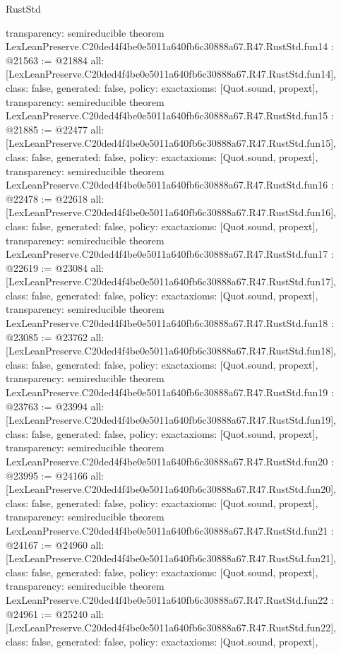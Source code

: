 \begin{lexlean}{RustStd}
\begin{coremodule}
{  transparency: semireducible
}
theorem LexLeanPreserve.C20ded4f4be0e5011a640fb6c30888a67.R47.RustStd.fun14 : @21563 := @21884 {
  all: [LexLeanPreserve.C20ded4f4be0e5011a640fb6c30888a67.R47.RustStd.fun14],
  class: false,
  generated: false,
  policy: exact{axioms: [Quot.sound, propext]},
  transparency: semireducible
}
theorem LexLeanPreserve.C20ded4f4be0e5011a640fb6c30888a67.R47.RustStd.fun15 : @21885 := @22477 {
  all: [LexLeanPreserve.C20ded4f4be0e5011a640fb6c30888a67.R47.RustStd.fun15],
  class: false,
  generated: false,
  policy: exact{axioms: [Quot.sound, propext]},
  transparency: semireducible
}
theorem LexLeanPreserve.C20ded4f4be0e5011a640fb6c30888a67.R47.RustStd.fun16 : @22478 := @22618 {
  all: [LexLeanPreserve.C20ded4f4be0e5011a640fb6c30888a67.R47.RustStd.fun16],
  class: false,
  generated: false,
  policy: exact{axioms: [Quot.sound, propext]},
  transparency: semireducible
}
theorem LexLeanPreserve.C20ded4f4be0e5011a640fb6c30888a67.R47.RustStd.fun17 : @22619 := @23084 {
  all: [LexLeanPreserve.C20ded4f4be0e5011a640fb6c30888a67.R47.RustStd.fun17],
  class: false,
  generated: false,
  policy: exact{axioms: [Quot.sound, propext]},
  transparency: semireducible
}
theorem LexLeanPreserve.C20ded4f4be0e5011a640fb6c30888a67.R47.RustStd.fun18 : @23085 := @23762 {
  all: [LexLeanPreserve.C20ded4f4be0e5011a640fb6c30888a67.R47.RustStd.fun18],
  class: false,
  generated: false,
  policy: exact{axioms: [Quot.sound, propext]},
  transparency: semireducible
}
theorem LexLeanPreserve.C20ded4f4be0e5011a640fb6c30888a67.R47.RustStd.fun19 : @23763 := @23994 {
  all: [LexLeanPreserve.C20ded4f4be0e5011a640fb6c30888a67.R47.RustStd.fun19],
  class: false,
  generated: false,
  policy: exact{axioms: [Quot.sound, propext]},
  transparency: semireducible
}
theorem LexLeanPreserve.C20ded4f4be0e5011a640fb6c30888a67.R47.RustStd.fun20 : @23995 := @24166 {
  all: [LexLeanPreserve.C20ded4f4be0e5011a640fb6c30888a67.R47.RustStd.fun20],
  class: false,
  generated: false,
  policy: exact{axioms: [Quot.sound, propext]},
  transparency: semireducible
}
theorem LexLeanPreserve.C20ded4f4be0e5011a640fb6c30888a67.R47.RustStd.fun21 : @24167 := @24960 {
  all: [LexLeanPreserve.C20ded4f4be0e5011a640fb6c30888a67.R47.RustStd.fun21],
  class: false,
  generated: false,
  policy: exact{axioms: [Quot.sound, propext]},
  transparency: semireducible
}
theorem LexLeanPreserve.C20ded4f4be0e5011a640fb6c30888a67.R47.RustStd.fun22 : @24961 := @25240 {
  all: [LexLeanPreserve.C20ded4f4be0e5011a640fb6c30888a67.R47.RustStd.fun22],
  class: false,
  generated: false,
  policy: exact{axioms: [Quot.sound, propext]},
}
\end{coremodule}
\end{lexlean}

